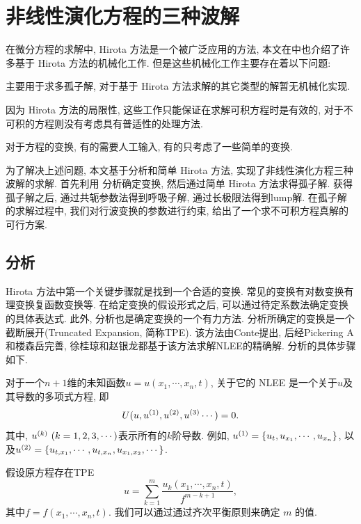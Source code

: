 \chapter{非线性演化方程的三种波解}\label{ch02}
在微分方程的求解中, Hirota 方法是一个被广泛应用的方法, 本文在中也介绍了许多基于 Hirota 方法的机械化工作. 但是这些机械化工作主要存在着以下问题:
\begin{inparaenum}[(1)]
\item 主要用于求多孤子解, 对于基于 Hirota 方法求解的其它类型的解暂无机械化实现.
\item 因为 Hirota 方法的局限性, 这些工作只能保证在求解可积方程时是有效的, 对于不可积的方程则没有考虑具有普适性的处理方法. 
\item 对于方程的变换, 有的需要人工输入, 有的只考虑了一些简单的变换. 
\end{inparaenum}

为了解决上述问题, 本文基于\Painleve{}分析和简单 Hirota 方法, 实现了非线性演化方程三种波解的求解. 首先利用 \Painleve{} 分析确定变换, 然后通过简单 Hirota 方法求得孤子解. 获得孤子解之后, 通过共轭参数法得到呼吸子解, 通过长极限法得到lump解. 在孤子解的求解过程中, 我们对行波变换的参数进行约束, 给出了一个求不可积方程真解的可行方案. 

\section{\Painleve{}分析}

Hirota 方法中第一个关键步骤就是找到一个合适的变换. 常见的变换有对数变换\D 有理变换\D 复函数变换等. 在给定变换的假设形式之后, 可以通过待定系数法确定变换的具体表达式.  此外, \Painleve{}分析也是确定变换的一个有力方法. \Painleve{}分析所确定的变换是一个\Painleve{}截断展开(Truncated \Painleve{} Expansion, 简称TPE). 该方法由Conte\cite{conte1989invariant}提出, 后经Pickering A\cite{pickering1993new}和楼森岳\cite{lou1998extended}完善, 徐桂琼\cite{xuPHD}和赵银龙\cite{zhaoMST}都基于该方法求解NLEE的精确解. \Painleve{}分析的具体步骤如下. 

对于一个$n+1$维的未知函数$u=u(x_1,\cdots,x_n,t)$, 关于它的 NLEE 是一个关于$u$及其导数的多项式方程, 即
\begin{equation}
    U(u,u^{(1)},u^{(2)},u^{(3)}\cdots)=0. \label{oeq}
\end{equation}
其中, $u^{(k)}~(k=1,2,3,\cdots)$表示所有的$k$阶导数. 例如, $u^{(1)}=\left\{u_t,u_{x_1},\cdots,u_{x_n}\right\}$, 以及$u^{(2)}=\left\{u_{t,x_1},\cdots,u_{t,x_n},u_{x_1,x_2},\cdots\right\}$.

假设原方程存在TPE
\begin{equation}
    u=\sum_{k=1}^{m}{\frac{u_k(x_1,\cdots,x_n,t)}{f^{m-k+1}}},  \label{tr}
\end{equation}
其中$f=f(x_1,\cdots,x_n,t)$. 我们可以通过通过齐次平衡原则来确定 $m$ 的值. 

